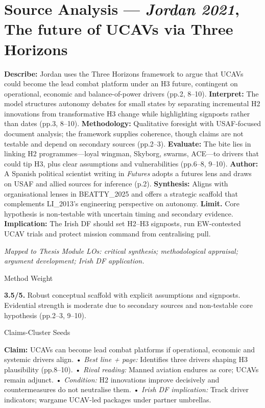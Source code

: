 \section*{Source Analysis — \textit{Jordan 2021}, The future of UCAVs via Three Horizons}
\textbf{Describe:} Jordan uses the Three Horizons framework to argue that UCAVs could become the lead combat platform under an H3 future, contingent on operational, economic and balance-of-power drivers (pp.2, 8–10).
\textbf{Interpret:} The model structures autonomy debates for small states by separating incremental H2 innovations from transformative H3 change while highlighting signposts rather than dates (pp.3, 8–10).
\textbf{Methodology:} Qualitative foresight with USAF-focused document analysis; the framework supplies coherence, though claims are not testable and depend on secondary sources (pp.2–3).
\textbf{Evaluate:} The bite lies in linking H2 programmes—loyal wingman, Skyborg, swarms, ACE—to drivers that could tip H3, plus clear assumptions and vulnerabilities (pp.6–8, 9–10).
\textbf{Author:} A Spanish political scientist writing in \textit{Futures} adopts a futures lens and draws on USAF and allied sources for inference (p.2).
\textbf{Synthesis:} Aligns with organisational lenses in BEATTY_2025 and offers a strategic scaffold that complements LI_2013’s engineering perspective on autonomy.
\textbf{Limit.} Core hypothesis is non-testable with uncertain timing and secondary evidence. \textbf{Implication:} The Irish DF should set H2–H3 signposts, run EW-contested UCAV trials and protect mission command from centralising pull.

\textit{Mapped to Thesis Module LOs: critical synthesis; methodological appraisal; argument development; Irish DF application.}

Method Weight

\textbf{3.5/5.} Robust conceptual scaffold with explicit assumptions and signposts. Evidential strength is moderate due to secondary sources and non-testable core hypothesis (pp.2–3, 9–10).

Claims-Cluster Seeds

\textbf{Claim:} UCAVs can become lead combat platforms if operational, economic and systemic drivers align.
• \emph{Best line + page:} Identifies three drivers shaping H3 plausibility (pp.8–10).
• \emph{Rival reading:} Manned aviation endures as core; UCAVs remain adjunct.
• \emph{Condition:} H2 innovations improve decisively and countermeasures do not neutralise them.
• \emph{Irish DF implication:} Track driver indicators; wargame UCAV-led packages under partner umbrellas.

